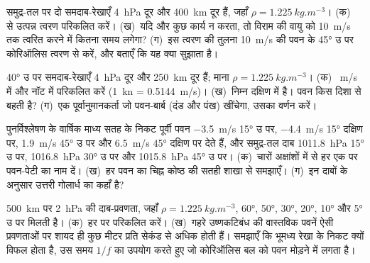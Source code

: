 \begin{exercise}[$\star$]\label{exo:b1:atmospheric-circulation:2}
समुद्र-तल पर दो समदाब-रेखाएँ \qty{4}{hPa} दूर और \qty{400}{km} दूर हैं, जहाँ $\rho =
\qty{1.225}{kg.m^{-3}}$। (क)~ से उत्पन्न त्वरण परिकलित करें। (ख)~यदि और कुछ कार्य न करता, तो विराम की वायु को \qty{10}{m/s} तक त्वरित करने में कितना समय लगेगा? (ग)~इस त्वरण की तुलना \qty{10}{m/s} की पवन के \ang{45} उ पर कोरिऑलिस त्वरण से करें, और बताएँ कि यह क्या सुझाता है।
\end{exercise}

\begin{exercise}[$\star$]\label{exo:b1:atmospheric-circulation:3}
\ang{40} उ पर समदाब-रेखाएँ \qty{4}{hPa} दूर और \qty{250}{km} दूर हैं; माना $\rho =
\qty{1.225}{kg.m^{-3}}$। (क)~ \unit{m/s} में और नॉट में परिकलित करें
(\qty{1}{kn} = \qty{0.5144}{m/s})। (ख)~निम्न दक्षिण में है। पवन किस दिशा से बहती है? (ग)~एक पूर्वानुमानकर्ता जो पवन-बार्ब (दंड और पंख) खींचेगा, उसका वर्णन करें।
\end{exercise}

\begin{exercise}[$\star$]\label{exo:b1:atmospheric-circulation:4}
पुनर्विश्लेषण के वार्षिक माध्य सतह के निकट पूर्वी पवन \qty{-3.5}{m/s} \ang{15} उ पर, \qty{-4.4}{m/s} \ang{15} दक्षिण पर, \qty{+1.9}{m/s} \ang{45} उ पर और \qty{+6.5}{m/s} \ang{45} दक्षिण पर देते हैं, और समुद्र-तल दाब \qty{1011.8}{hPa} \ang{15} उ पर, \qty{1016.8}{hPa} \ang{30} उ पर और \qty{1015.8}{hPa} \ang{45} उ पर। (क)~चारों अक्षांशों में से हर एक पर पवन-पेटी का नाम दें। (ख)~हर पवन का चिह्न कोष्ठ की सतही शाखा से समझाएँ। (ग)~इन दाबों के अनुसार उत्तरी गोलार्ध का  कहाँ है?
\end{exercise}

\begin{exercise}[$\star\star$]\label{exo:b1:atmospheric-circulation:5}
\qty{500}{km} पर \qty{2}{hPa} की दाब-प्रवणता, जहाँ $\rho =
\qty{1.225}{kg.m^{-3}}$, \ang{60}, \ang{50}, \ang{30}, \ang{20}, \ang{10} और \ang{5} उ पर मिलती है। (क)~हर  पर  परिकलित करें।
(ख)~गहरे उष्णकटिबंध की वास्तविक पवनें ऐसी प्रवणताओं पर शायद ही कुछ मीटर प्रति सेकंड से अधिक होती हैं। समझाएँ कि  भूमध्य रेखा के निकट क्यों विफल होता है, उस समय $1/f$ का उपयोग करते हुए जो कोरिऑलिस बल को पवन मोड़ने में लगता है।
\end{exercise}

